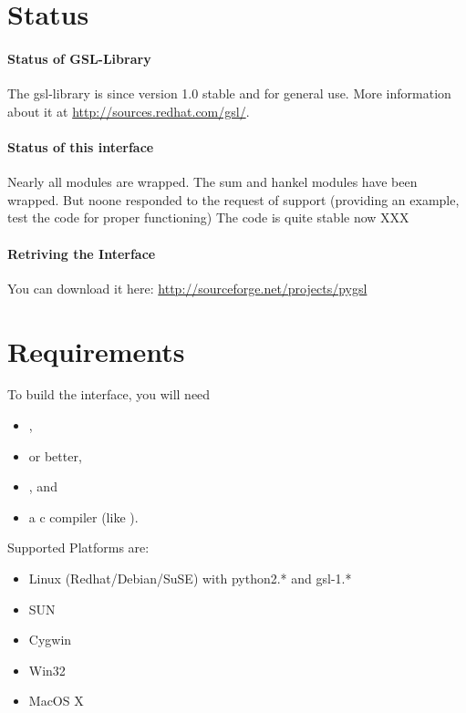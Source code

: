 \section{Status}

\paragraph*{Status of GSL-Library}
The gsl-library is since version 1.0 stable and for general use.
More information about it at \url{http://sources.redhat.com/gsl/}.

\paragraph*{Status of this interface}
Nearly all modules are wrapped. The sum and hankel modules have been
wrapped. But noone responded to the request of support (providing an example,
test the code for proper functioning)
The code is quite stable now XXX 

\paragraph*{Retriving the Interface}
You can download it here: \url{http://sourceforge.net/projects/pygsl}

\section{Requirements}

To build the interface, you will need
\begin{itemize}
\item {},
\item {} or better,
\item {}, and
\item a c compiler (like ).
\end{itemize}

Supported Platforms are:
\begin{itemize}
\item Linux (Redhat/Debian/SuSE) with python2.* and gsl-1.*
\item SUN
\item Cygwin
\item Win32
\item MacOS X
\end{itemize}

